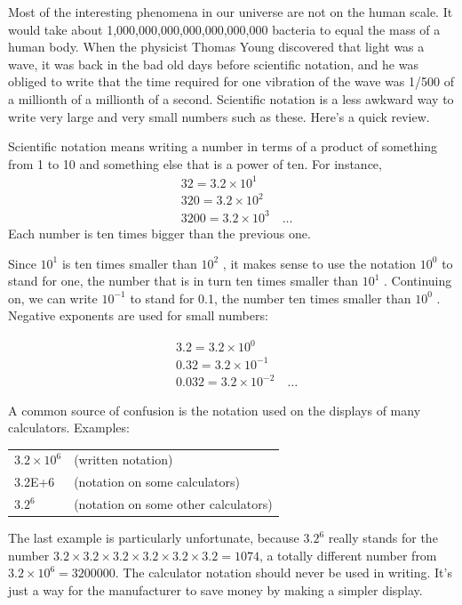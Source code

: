 Most of the interesting phenomena in our universe
are not on the human scale. It would take about 1,000,000,000,000,000,000,000
bacteria to equal the mass of a human body. When the
physicist Thomas Young discovered that light was a wave, it
was back in the bad old days before scientific notation, and
he was obliged to write that the time required for one
vibration of the wave was 1/500 of a millionth of a
millionth of a second. Scientific notation is a less awkward
way to write very large and very small numbers such as
these.  Here's a quick review.

Scientific notation means writing a number in terms of a
product of something from 1 to 10 and something else that is
a power of ten. For instance,
\begin{align*}
& 32 = 3.2 \times 10^1\\
& 320 =  3.2 \times 10^2\\
& 3200 = 3.2 \times 10^3  \quad\ldots
\end{align*}
Each number is ten times bigger than the previous one.

Since $10^1$  is ten times smaller than $10^2$ , it makes
sense to use the notation $10^0$  to stand for one, the
number that is in turn ten times smaller than $10^1$ .
Continuing on, we can write $10^{-1}$  to stand for 0.1, the
number ten times smaller than $10^0$ . Negative exponents
are used for small numbers:

\begin{align*}
&3.2 =  3.2 \times 10^0\\
&0.32 = 3.2 \times 10^{-1}\\
&0.032 = 3.2 \times 10^{-2} \quad\ldots
\end{align*}

A common source of confusion is the notation used on the
displays of many calculators. Examples:

\vspace{8mm}

\hspace{10mm}\begin{tabular}{ll}
$3.2 \times 10^6$  &     (written notation)\\
3.2E+6             &     (notation on some calculators)\\
$3.2^6$            &     (notation on some other calculators)
\end{tabular}

\vspace{8mm}

\noindent The last example is particularly unfortunate, because
$3.2^6$ really stands for the number 
$3.2 \times 3.2 \times 3.2 \times 3.2 \times 3.2 \times 3.2= 1074$, a totally different number from $3.2 \times 10^6=3200000$.
The calculator notation should never be used in writing.
It's just a way for the manufacturer to save money by
making a simpler display.

